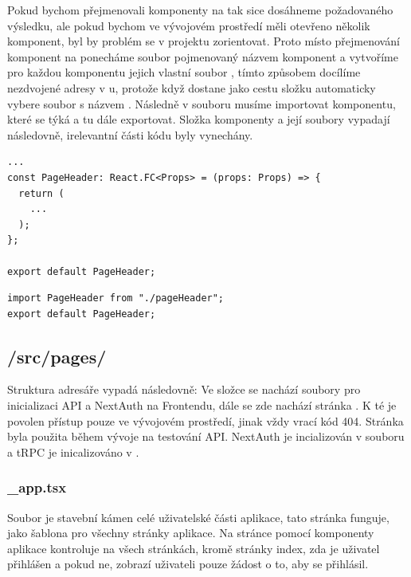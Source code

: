 Pokud bychom přejmenovali komponenty na  tak sice dosáhneme požadovaného výsledku, ale pokud bychom ve vývojovém prostředí měli otevřeno několik komponent, byl by problém se v projektu zorientovat.
Proto místo přejmenování komponent na  ponecháme soubor pojmenovaný názvem komponent a vytvoříme pro každou komponentu jejich vlastní soubor , tímto způsobem docílíme nezdvojené adresy v u, protože když  dostane jako cestu složku automaticky vybere soubor s názvem . Následně v souboru  musíme importovat komponentu, které se týká a tu dále exportovat. Složka komponenty a její soubory vypadají následovně, irelevantní části kódu byly vynechány.
\begin{lstlisting}[caption=Deklarace komponenty pageHeader]
...
const PageHeader: React.FC<Props> = (props: Props) => {
  return (
    ...
  );
};

export default PageHeader;
\end{lstlisting}
\begin{lstlisting}[caption=Soubor index.tsx komponenty pageHeader]
import PageHeader from "./pageHeader";
export default PageHeader;
\end{lstlisting}
\subsection{/src/pages/}
Struktura adresáře  vypadá následovně:
\hfill \break
Ve složce  se nachází soubory pro inicializaci API a NextAuth na Frontendu, dále se zde nachází stránka . K té je povolen přístup pouze ve vývojovém prostředí, jinak vždy vrací kód 404. Stránka byla použita během vývoje na testování API. NextAuth je incializován v souboru  a tRPC je inicalizováno v .

\subsubsection{\_app.tsx}
Soubor  je stavební kámen celé uživatelské části aplikace, tato stránka funguje, jako šablona pro všechny stránky aplikace. Na stránce pomocí komponenty  aplikace kontroluje na všech stránkách, kromě stránky index, zda je uživatel přihlášen a pokud ne, zobrazí uživateli pouze žádost o to, aby se přihlásil.

